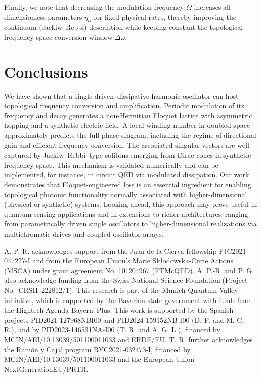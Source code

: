 \documentclass[a4paper,twocolumn,floatfix,10pt,superscriptaddress]%
{quantumarticle}
\begin{document}
{Finally, we note that decreasing the modulation frequency $\Omega$ increases all dimensionless parameters $\eta_{\alpha}$ for fixed physical rates, thereby improving the continuum (Jackiw--Rebbi) description while keeping constant the topological  frequency-space conversion window $\Delta \omega$.
}

\section{Conclusions} We have shown that a single driven–dissipative harmonic oscillator can host topological frequency conversion and amplification. Periodic modulation of its frequency and decay generates a non-Hermitian Floquet lattice with asymmetric hopping and a synthetic electric field. A local winding number in doubled space approximately predicts the full phase diagram, including the regime of directional gain and efficient frequency conversion. The associated singular vectors are well captured by Jackiw–Rebbi–type solitons emerging from Dirac cones in synthetic-frequency space. This mechanism is validated numerically and can be implemented, for instance, in circuit QED via modulated dissipation. Our work demonstrates that Floquet-engineered loss is an essential ingredient for enabling topological photonic functionality normally associated with higher-dimensional (physical or synthetic) systems. Looking ahead, this approach may prove useful in quantum-sensing applications and in extensions to richer architectures, ranging from parametrically driven single oscillators to higher-dimensional realizations via multichromatic drives and coupled-oscillator arrays.
\begin{acknowledgments}
A. P.-R. acknowledges support from the Juan de la Cierva fellowship FJC2021-047227-I and from the European Union’s Marie Skłodowska-Curie Actions (MSCA) under grant agreement No. 101204967 (FTMcQED). A. P.-R. and P. G. also acknowledge funding from the Swiss National Science Foundation (Project No.\ CRSII~222812/1). 
This research is part of the Munich Quantum Valley initiative, which is supported by the Bavarian state government with funds from the Hightech Agenda Bayern~Plus. This work is supported by the Spanish projects PID2021-127968NBI00 and PID2024-159152NB-I00 (D. P. and M. C. R.), and by PID2023-146531NA-I00 (T. R. and A. G. L.), financed by MCIN/AEI/10.13039/501100011033 and ERDF/EU. T. R. further acknowledges the Ram\'on y Cajal program RYC2021-032473-I, financed by MCIN/AEI/10.13039/501100011033 and the European Union NextGenerationEU/PRTR.
\end{acknowledgments}
\end{document}
